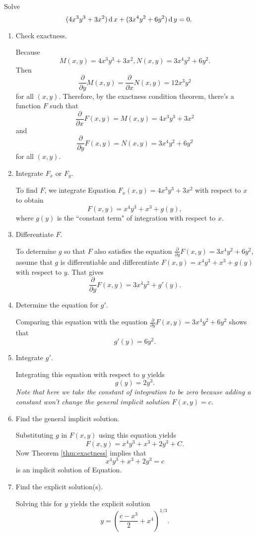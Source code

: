 \begin{example}
  Solve
\[(4x^3y^3+3x^2)\operatorname{d} x+(3x^4y^2+6y^2)\operatorname{d} y=0.\]
\end{example}
\begin{solution}
  \begin{enumerate}[label={Step \arabic*:}, leftmargin=*]
    \item Check exactness.
  
    Because 
  \[M(x,y)=4x^3y^3+3x^2, N(x,y)=3x^4y^2+6y^2.\]
  Then 
  \[\frac{\partial}{\partial y} M(x,y)=\frac{\partial}{\partial x} N(x,y)=12 x^3y^2\] 
  for all $(x,y)$. Therefore, by the exactness condition theorem, there’s a function $F$ such that
  \[\frac{\partial}{\partial x}F(x,y)=M(x,y)=4x^3y^3+3x^2\]
  and  
  \[\frac{\partial}{\partial y}F(x,y)=N(x,y)=3x^4y^2+6y^2\]
  for all $(x,y)$.
  
  \item Integrate $F_x$ or $F_y$.
  
  To find $F$, we integrate Equation $F_x(x,y)=4x^3y^3+3x^2$ with respect to $x$ to obtain
  \[F(x,y)=x^4y^3+x^3+g(y),\]
  where $g(y)$ is the ``constant term" of integration with respect to $x$.

  \item Differentiate $F$.
  
  To determine $g$ so that $F$ also satisfies the equation $\frac{\partial}{\partial y}F(x,y)=3x^4y^2+6y^2$, assume that $g$ is differentiable and differentiate $F(x,y)=x^4y^3+x^3+g(y)$ with respect to $y$. That gives
  \[\frac{\partial}{\partial y}F(x,y)=3x^4y^2+g'(y).\]

  \item Determine the equation for $g'$.
  
  Comparing this equation with the equation $\frac{\partial}{\partial y}F(x,y)=3x^4y^2+6y^2$ shows that
  \[g'(y)=6y^2.\]

  \item Integrate $g'$.
  
  Integrating this equation with respect to $y$ yields
  \[g(y)=2y^3.\]
  \emph{Note that here we take the constant of integration to be zero because adding a constant won't change the general implicit solution $F(x, y)=c$.}

  \item Find the general implicit solution.
  
  Substituting $g$ in $F(x, y)$ using this equation yields
  \[F(x,y)=x^4y^3+x^3+2y^3+C.\]
  Now Theorem \ref{thm:exactness} implies that \[x^4y^3+x^3+2y^3=c\] is an implicit solution of Equation.
  
  \item Find the explicit solution(s).
  
  Solving this for $y$ yields the explicit solution
  \[y=\left(\frac{c-x^3}{2}+x^4\right)^{1/3}.\]
\end{enumerate}
\end{solution}

